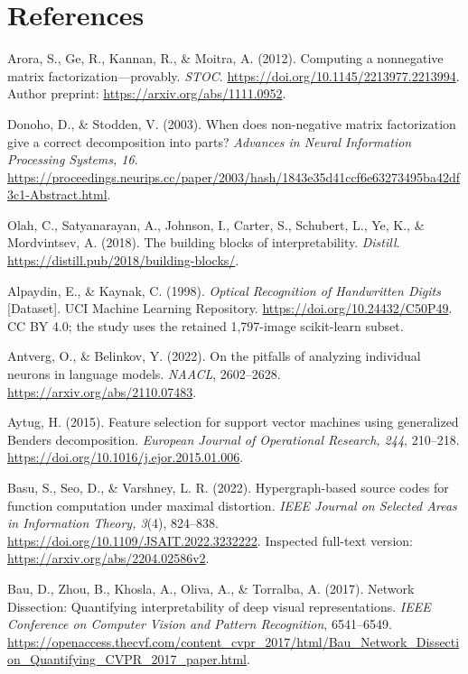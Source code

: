 \documentclass[
  british,
  11pt,
  a4paper,
]{article}
\begin{document}
\section*{References}\label{references}

Arora, S., Ge, R., Kannan, R., \& Moitra, A. (2012). Computing a
nonnegative matrix factorization---provably. \emph{STOC}.
\url{https://doi.org/10.1145/2213977.2213994}. Author preprint:
\url{https://arxiv.org/abs/1111.0952}.

Donoho, D., \& Stodden, V. (2003). When does non-negative matrix
factorization give a correct decomposition into parts? \emph{Advances in
Neural Information Processing Systems, 16}.
\url{https://proceedings.neurips.cc/paper/2003/hash/1843e35d41ccf6e63273495ba42df3c1-Abstract.html}.

Olah, C., Satyanarayan, A., Johnson, I., Carter, S., Schubert, L., Ye,
K., \& Mordvintsev, A. (2018). The building blocks of interpretability.
\emph{Distill}. \url{https://distill.pub/2018/building-blocks/}.

Alpaydin, E., \& Kaynak, C. (1998). \emph{Optical Recognition of
Handwritten Digits} {[}Dataset{]}. UCI Machine Learning Repository.
\url{https://doi.org/10.24432/C50P49}. CC BY 4.0; the study uses the
retained 1,797-image scikit-learn subset.

Antverg, O., \& Belinkov, Y. (2022). On the pitfalls of analyzing
individual neurons in language models. \emph{NAACL}, 2602--2628.
\url{https://arxiv.org/abs/2110.07483}.

Aytug, H. (2015). Feature selection for support vector machines using
generalized Benders decomposition. \emph{European Journal of Operational
Research, 244}, 210--218.
\url{https://doi.org/10.1016/j.ejor.2015.01.006}.

Basu, S., Seo, D., \& Varshney, L. R. (2022). Hypergraph-based source
codes for function computation under maximal distortion. \emph{IEEE
Journal on Selected Areas in Information Theory, 3}(4), 824--838.
\url{https://doi.org/10.1109/JSAIT.2022.3232222}. Inspected full-text
version: \url{https://arxiv.org/abs/2204.02586v2}.

Bau, D., Zhou, B., Khosla, A., Oliva, A., \& Torralba, A. (2017).
Network Dissection: Quantifying interpretability of deep visual
representations. \emph{IEEE Conference on Computer Vision and Pattern
Recognition}, 6541--6549.
\url{https://openaccess.thecvf.com/content_cvpr_2017/html/Bau_Network_Dissection_Quantifying_CVPR_2017_paper.html}.
\end{document}
